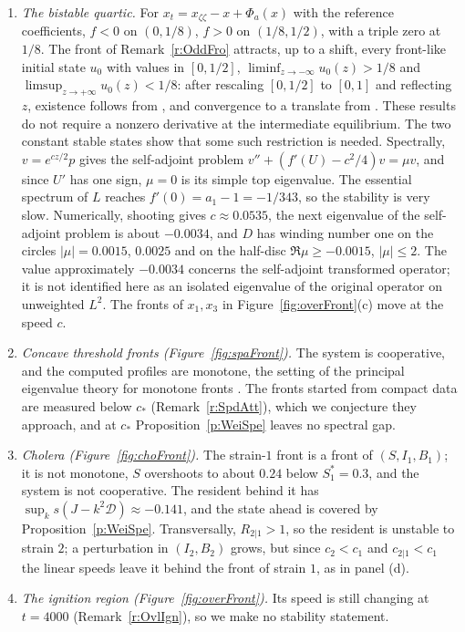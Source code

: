 \begin{enumerate}
\item \emph{The bistable quartic.} For $x_t=x_{\zeta\zeta}-x+\Phi_a(x)$ with the reference coefficients, $f<0$ on $(0,1/8)$, $f>0$ on $(1/8,1/2)$, with a triple zero at $1/8$. The front of Remark~\ref{r:OddFro} attracts, up to a shift, every front-like initial state $u_0$ with values in $[0,1/2]$, $\liminf_{z\to-\infty}u_0(z)>1/8$ and $\limsup_{z\to+\infty}u_0(z)<1/8$: after rescaling $[0,1/2]$ to $[0,1]$ and reflecting $z$, existence follows from \cite[Theorem 2.4(c)]{FifeMcLeod1977}, and convergence to a translate from \cite[Theorem 3.1]{FifeMcLeod1977}. These results do not require a nonzero derivative at the intermediate equilibrium. The two constant stable states show that some such restriction is needed. Spectrally, $v=e^{cz/2}p$ gives the self-adjoint problem $v''+(f'(U)-c^2/4)v=\mu v$, and since $U'$ has one sign, $\mu=0$ is its simple top eigenvalue. The essential spectrum of $L$ reaches $f'(0)=a_1-1=-1/343$, so the stability is very slow. Numerically, shooting gives $c\approx0.0535$, the next eigenvalue of the self-adjoint problem is about $-0.0034$, and $D$ has winding number one on the circles $|\mu|=0.0015$, $0.0025$ and on the half-disc $\Re\mu\ge-0.0015$, $|\mu|\le2$. The value approximately $-0.0034$ concerns the self-adjoint transformed operator; it is not identified here as an isolated eigenvalue of the original operator on unweighted $L^2$. The fronts of $x_1,x_3$ in Figure~\ref{fig:overFront}(c) move at the speed $c$.
\item \emph{Concave threshold fronts (Figure~\ref{fig:spaFront}).} The system is cooperative, and the computed profiles are monotone, the setting of the principal eigenvalue theory for monotone fronts \cite{Volpert-alt2}. The fronts started from compact data are measured below $c_*$ (Remark~\ref{r:SpdAtt}), which we conjecture they approach, and at $c_*$ Proposition~\ref{p:WeiSpe} leaves no spectral gap.
\item \emph{Cholera (Figure~\ref{fig:choFront}).} The strain-$1$ front is a front of $(S,I_1,B_1)$; it is not monotone, $S$ overshoots to about $0.24$ below $S_1^*=0.3$, and the system is not cooperative. The resident behind it has $\sup_ks(J-k^2\mathcal D)\approx-0.141$, and the state ahead is covered by Proposition~\ref{p:WeiSpe}. Transversally, $R_{2|1}>1$, so the resident is unstable to strain $2$; a perturbation in $(I_2,B_2)$ grows, but since $c_2<c_1$ and $c_{2|1}<c_1$ the linear speeds leave it behind the front of strain $1$, as in panel (d).
\item \emph{The ignition region (Figure~\ref{fig:overFront}).} Its speed is still changing at $t=4000$ (Remark~\ref{r:OvlIgn}), so we make no stability statement.
\end{enumerate}
